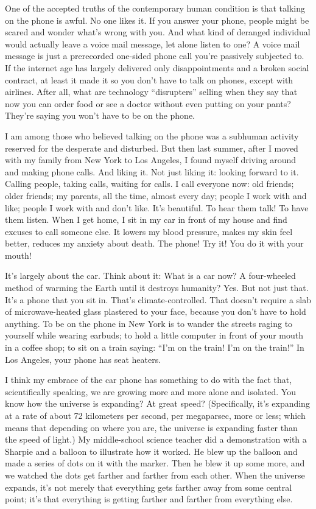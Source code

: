 One of the accepted truths of the contemporary human condition is that
talking on the phone is awful. No one likes it. If you answer your
phone, people might be scared and wonder what's wrong with you. And what
kind of deranged individual would actually leave a voice mail message,
let alone listen to one? A voice mail message is just a prerecorded
one-sided phone call you're passively subjected to. If the internet age
has largely delivered only disappointments and a broken social contract,
at least it made it so you don't have to talk on phones, except with
airlines. After all, what are technology ``disrupters'' selling when
they say that now you can order food or see a doctor without even
putting on your pants? They're saying you won't have to be on the phone.

I am among those who believed talking on the phone was a subhuman
activity reserved for the desperate and disturbed. But then last summer,
after I moved with my family from New York to Los Angeles, I found
myself driving around and making phone calls. And liking it. Not just
liking it: looking forward to it. Calling people, taking calls, waiting
for calls. I call everyone now: old friends; older friends; my parents,
all the time, almost every day; people I work with and like; people I
work with and don't like. It's beautiful. To hear them talk! To have
them listen. When I get home, I sit in my car in front of my house and
find excuses to call someone else. It lowers my blood pressure, makes my
skin feel better, reduces my anxiety about death. The phone! Try it! You
do it with your mouth!

It's largely about the car. Think about it: What is a car now? A
four-wheeled method of warming the Earth until it destroys humanity?
Yes. But not just that. It's a phone that you sit in. That's
climate-controlled. That doesn't require a slab of microwave-heated
glass plastered to your face, because you don't have to hold anything.
To be on the phone in New York is to wander the streets raging to
yourself while wearing earbuds; to hold a little computer in front of
your mouth in a coffee shop; to sit on a train saying: ``I'm on the
train! I'm on the train!'' In Los Angeles, your phone has seat heaters.

I think my embrace of the car phone has something to do with the fact
that, scientifically speaking, we are growing more and more alone and
isolated. You know how the universe is expanding? At great speed?
(Specifically, it's expanding at a rate of about 72 kilometers per
second, per megaparsec, more or less; which means that depending on
where you are, the universe is expanding faster than the speed of
light.) My middle-school science teacher did a demonstration with a
Sharpie and a balloon to illustrate how it worked. He blew up the
balloon and made a series of dots on it with the marker. Then he blew it
up some more, and we watched the dots get farther and farther from each
other. When the universe expands, it's not merely that everything gets
farther away from some central point; it's that everything is getting
farther and farther from everything else.

